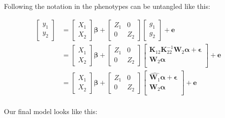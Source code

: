 \documentclass[12pt,titlepage]{article}
\begin{document}
Following the notation in  the phenotypes can be untangled 
like this:

\begin{align} \label{eq:entangled-augmented-single-step-model}
\begin{bmatrix}
  y_1 \\
  y_2 
 \end{bmatrix}
& =
 \begin{bmatrix}
  X_1 \\
  X_2 
 \end{bmatrix}
 \boldsymbol{\beta} + 
 \begin{bmatrix}
  Z_1 & 0 \\
  0 & Z_2 
 \end{bmatrix}
\begin{bmatrix}
  g_1 \\
  g_2 
 \end{bmatrix}
  + \mathbf{e} \\
    & = 
 \begin{bmatrix}
  X_1 \\
  X_2 
 \end{bmatrix}
 \boldsymbol{\beta} + 
 \begin{bmatrix}
  Z_1 & 0 \\
  0 & Z_2 
 \end{bmatrix}
\begin{bmatrix}
  \mathbf{K}_{12}\mathbf{K}_{22}^{-1}\mathbf{W}_2\boldsymbol{\alpha} + \boldsymbol{\epsilon}  \\
  \mathbf{W}_2\boldsymbol{\alpha} \\
 \end{bmatrix}
  + \mathbf{e} \\
    & = 
 \begin{bmatrix}
  X_1 \\
  X_2 
 \end{bmatrix}
 \boldsymbol{\beta} + 
 \begin{bmatrix}
  Z_1 & 0 \\
  0 & Z_2 
 \end{bmatrix}
\begin{bmatrix}
  \hat{\mathbf{W}_1}\boldsymbol{\alpha} + \boldsymbol{\epsilon} \\
  \mathbf{W}_2\boldsymbol{\alpha} \\
 \end{bmatrix}
  + \mathbf{e} \\
\end{align}


Our final model looks like this:
\end{document}
